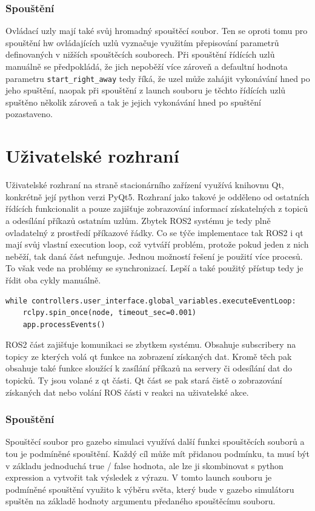 \subsubsection{Spouštění}
Ovládací uzly mají také svůj hromadný spouštěcí soubor. Ten se oproti tomu pro spouštění hw ovládajících uzlů vyznačuje využitím přepisování parametrů definovaných v nižších spouštěcích souborech. Při spouštění řídících uzlů manuálně se předpokládá, že jich nepoběží více zároveň a defaultní hodnota parametru \verb|start_right_away| tedy říká, že uzel může zahájit vykonávání hned po jeho spuštění, naopak při spouštění z launch souboru je těchto řídících uzlů spuštěno několik zároveň a tak je jejich vykonávání hned po spuštění pozastaveno.

\section{Uživatelské rozhraní}
Uživatelské rozhraní na straně stacionárního zařízení využívá knihovnu Qt, konkrétně její python verzi PyQt5. Rozhraní jako takové je odděleno od ostatních řídících funkcionalit a pouze zajišťuje zobrazování informací získatelných z topiců a odesílání příkazů ostatním uzlům. Zbytek ROS2 systému je tedy plně ovladatelný z prostředí příkazové řádky. Co se týče implementace tak ROS2 i qt mají svůj vlastní execution loop, což vytváří problém, protože pokud jeden z nich neběží, tak daná část nefunguje. Jednou možností řešení je použití více procesů. To však vede na problémy se synchronizací. Lepší a také použitý přístup tedy je řídit oba cykly manuálně. 
\begin{verbatim}
while controllers.user_interface.global_variables.executeEventLoop:
	rclpy.spin_once(node, timeout_sec=0.001)
	app.processEvents()
\end{verbatim}
ROS2 část zajišťuje komunikaci se zbytkem systému. Obsahuje subscribery na topicy ze kterých volá qt funkce na zobrazení získaných dat. Kromě těch pak obsahuje také funkce sloužící k zasílání příkazů na servery či odesílání dat do topicků. Ty jsou volané z qt části.
Qt část se pak stará čistě o zobrazování získaných dat nebo volání ROS části v reakci na uživatelské akce.

\subsubsection*{Spouštění}
Spouštěcí soubor pro gazebo simulaci využívá další funkci spouštěcích souborů a tou je podmíněné spouštění. Každý cíl může mít přidanou podmínku, ta musí být v základu jednoduchá true / false hodnota, ale lze ji skombinovat s python expression a vytvořit tak výsledek z výrazu. V tomto launch souboru je podmíněné spouštění využito k výběru světa, který bude v gazebo simulátoru spuštěn na základě hodnoty argumentu předaného spouštěcímu souboru.

